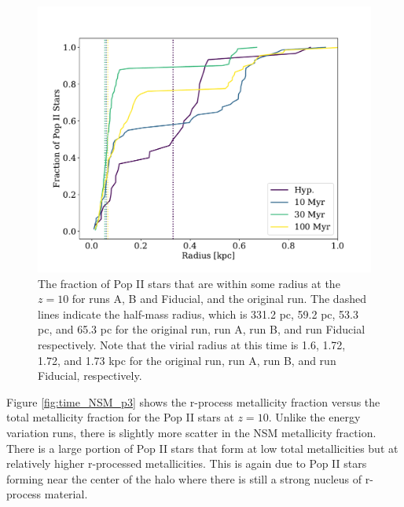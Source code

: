 \documentclass[fleqn,usenatbib]{mnras}
\begin{document}
\begin{figure} 
	\includegraphics[width=\columnwidth]{plots/time_stellar_dist.pdf}
	\caption[Radial distribution of Pop II stars in the delay time variation runs.]{The fraction of Pop II stars that are within some radius at the $z = 10$ for runs A, B and Fiducial, and the original run. The dashed lines indicate the half-mass radius, which is 331.2 pc, 59.2 pc, 53.3 pc, and 65.3 pc for the original run, run A, run B, and run Fiducial respectively. Note that the virial radius at this time is 1.6, 1.72, 1.72, and 1.73 kpc for the original run, run A, run B, and run Fiducial, respectively.}
	\label{fig:time_stellar_dist}
\end{figure}

Figure \ref{fig:time_NSM_p3} shows the r-process metallicity fraction versus the total metallicity fraction for the Pop II stars at $z = 10$. Unlike the energy variation runs, there is slightly more scatter in the NSM metallicity fraction. There is a large portion of Pop II stars that form at low total metallicities but at relatively higher r-processed metallicities. This is again due to Pop II stars forming near the center of the halo where there is still a strong nucleus of r-process material.
\end{document}
